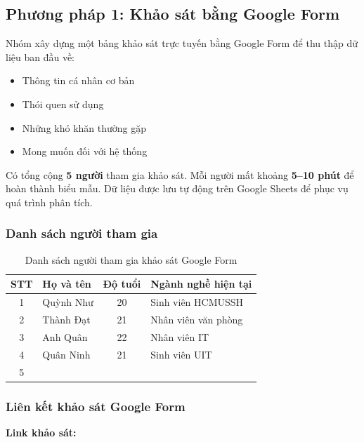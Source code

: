 \documentclass[a4paper,12pt]{article}
\begin{document}
\subsection{Phương pháp 1: Khảo sát bằng Google Form}

Nhóm xây dựng một bảng khảo sát trực tuyến bằng Google Form để thu thập dữ liệu ban đầu về:

\begin{itemize}
    \item Thông tin cá nhân cơ bản
    \item Thói quen sử dụng
    \item Những khó khăn thường gặp
    \item Mong muốn đối với hệ thống
\end{itemize}

Có tổng cộng \textbf{5 người} tham gia khảo sát. Mỗi người mất khoảng \textbf{5--10 phút} để hoàn thành biểu mẫu. Dữ liệu được lưu tự động trên Google Sheets để phục vụ quá trình phân tích.

\subsubsection*{Danh sách người tham gia}

\begin{table}[H]
\centering
\begin{tabular}{|c|p{4cm}|c|p{4cm}|}
\hline
\textbf{STT} & \textbf{Họ và tên} & \textbf{Độ tuổi} & \textbf{Ngành nghề hiện tại} \\
\hline
1 & Quỳnh Như & 20 & Sinh viên HCMUSSH \\
\hline
2 & Thành Đạt & 21 & Nhân viên văn phòng \\
\hline
3 & Anh Quân & 22 & Nhân viên IT \\
\hline
4 & Quân Ninh & 21 & Sinh viên UIT \\
\hline
5 & & & \\
\hline
\end{tabular}
\caption{Danh sách người tham gia khảo sát Google Form}
\end{table}

\vspace{0.5cm}

\subsubsection*{Liên kết khảo sát Google Form}

\noindent
\textbf{Link khảo sát:}
\end{document}

